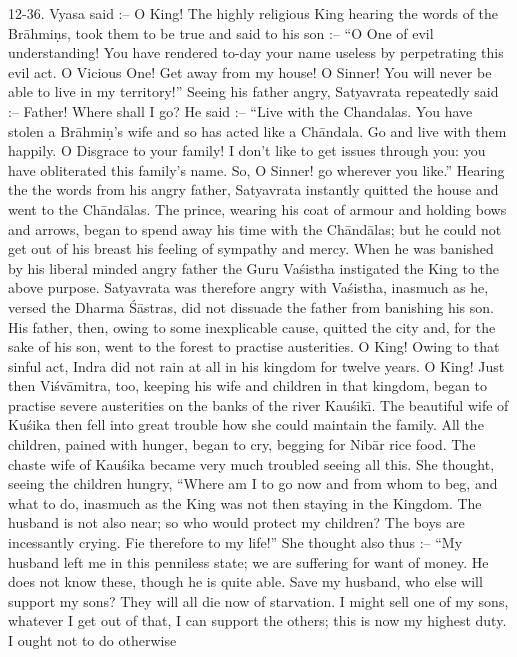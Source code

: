 12-36. Vyasa said :-- O King! The highly religious King hearing the words of the Br\=ahmi\d{n}s, took them to be true and said to his son :-- ``O One of evil understanding! You have rendered to-day your name useless by perpetrating this evil act. O Vicious One! Get away from my house! O Sinner! You will never be able to live in my territory!'' Seeing his father angry, Satyavrata repeatedly said :-- Father! Where shall I go? He said :-- ``Live with the Chandalas. You have stolen a Br\=ahmi\d{n}'s wife and so has acted like a Ch\=andala. Go and live with them happily. O Disgrace to your family! I don't like to get issues through you: you have obliterated this family's name. So, O Sinner! go wherever you like.'' Hearing the the words from his angry father, Satyavrata instantly quitted the house and went to the Ch\=and\=alas. The prince, wearing his coat of armour and holding bows and arrows, began to spend away his time with the Ch\=and\=alas; but he could not get out of his breast his feeling of sympathy and mercy. When he was banished by his liberal minded angry father the Guru Va\'sistha instigated the King to the above purpose. Satyavrata was therefore angry with Va\'sistha, inasmuch as he, versed the Dharma \'S\=astras, did not dissuade the father from banishing his son. His father, then, owing to some inexplicable cause, quitted the city and, for the sake of his son, went to the forest to practise austerities. O King! Owing to that sinful act, Indra did not rain at all in his kingdom for twelve years. O King! Just then Vi\'sv\=amitra, too, keeping his wife and children in that kingdom, began to practise severe austerities on the banks of the river Kau\'sik\={\i}. The beautiful wife of Ku\'sika then fell into great trouble how she could maintain the family. All the children, pained with hunger, began to cry, begging for Nib\=ar rice food. The chaste wife of Kau\'sika became very much troubled seeing all this. She thought, seeing the children hungry, ``Where am I to go now and from whom to beg, and what to do, inasmuch as the King was not then staying in the Kingdom. The husband is not also near; so who would protect my children? The boys are incessantly crying. Fie therefore to my life!'' She thought also thus :-- ``My husband left me in this penniless state; we are suffering for want of money. He does not know these, though he is quite able. Save my husband, who else will support my sons? They will all die now of starvation. I might sell one of my sons, whatever I get out of that, I can support the others; this is now my highest duty. I ought not to do otherwise

